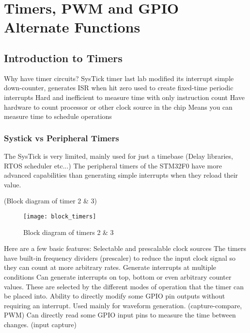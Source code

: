 \documentclass[11pt,fleqn]{book} %
\begin{document}
	
\chapter{Timers, PWM and GPIO Alternate Functions}

\section{Introduction to Timers}
    Why have timer circuits?
        SysTick timer
            last lab modified its interrupt
            simple down-counter, generates ISR when hit zero
            used to create fixed-time periodic interrupts
        Hard and inefficient to measure time with only instruction count
        Have hardware to count processor or other clock source in the chip
        Means you can measure time to schedule operations
    
    \subsection{Systick vs Peripheral Timers}
        The SysTick is very limited, mainly used for just a timebase (Delay libraries, RTOS scheduler etc...)
        The peripheral timers of the STM32F0 have more advanced capabilities than generating simple interrupts when they reload their value. 
        
        (Block diagram of timer 2 \& 3)
        \begin{figure}[]
            \centering\texttt{[image: block\_timers]}
            \caption{Block diagram of timers 2 \& 3}
            \label{block_timers}
        \end{figure}
        
        Here are a few basic features:
            Selectable and prescalable clock sources
                The timers have built-in frequency dividers (prescaler) to reduce the input clock signal so they can count at more arbitrary rates. 
            Generate interrupts at multiple conditions 
                Can generate interrupts on top, bottom or even arbitrary counter values. 
                These are selected by the different modes of operation that the timer can be placed into. 
        Ability to directly modify some GPIO pin outputs without requiring an interrupt. Used mainly for waveform generation. (capture-compare, PWM)
        Can directly read some GPIO input pins to measure the time between changes. (input capture)	
    
\end{document}

